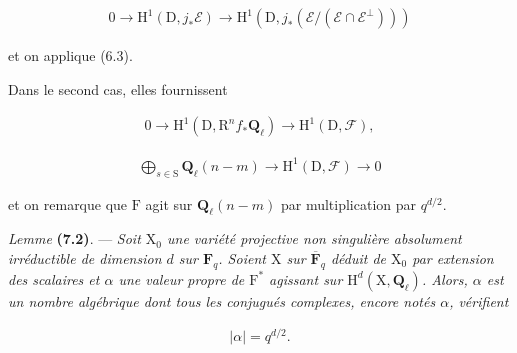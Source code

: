 \documentclass[10pt,leqno]{article}
\begin{document}
\begin{equation*}\begin{gathered}0 \longrightarrow  \mathrm{H}^{1}(\mathrm{D},j_{*}\mathcal{E} ) \longrightarrow  \mathrm{H}^{1}(\mathrm{D},j_{*}(\mathcal{E} /(\mathcal{E} \cap \mathcal{E} ^{\perp })))\end{gathered}\tag{7.1.3′}\end{equation*}

\noindent et on applique (6.3).\par

\noindent Dans le second cas, elles fournissent\par

\begin{equation*}\begin{gathered}0 \longrightarrow  \mathrm{H}^{1}(\mathrm{D},\mathrm{R}^{n} f_{*}\mathbf{Q}_{\ell }) \longrightarrow  \mathrm{H}^{1}(\mathrm{D},\mathcal{F} ),\end{gathered}\tag{7.1.4′}\end{equation*}

\begin{equation*}\begin{gathered}\bigoplus\limits_{s\in \mathrm{S}}\mathbf{Q}_{\ell }(n- m) \longrightarrow  \mathrm{H}^{1}(\mathrm{D},\mathcal{F} ) \longrightarrow  0\end{gathered}\tag{7.1.5′}\end{equation*}

\noindent et on remarque que \(\mathrm{F}\) agit sur \(\mathbf{Q}_{\ell }(n- m)\) par multiplication par \(q^{d/2}\).\par

\noindent \emph{Lemme} \textbf{(7.2)}. — {\itshape Soit \(\mathrm{X}_{0}\) une variété projective non singulière absolument irréductible de dimension \(d\) sur \(\mathbf{F}_{q}\). Soient \(\mathrm{X}\) sur \(\overline{\mathbf{F}}_{q}\) déduit de \(\mathrm{X}_{0}\) par extension des scalaires et \(\alpha \) une valeur propre de \(\mathrm{F}^{*}\) agissant sur \(\mathrm{H}^{d}(\mathrm{X},\mathbf{Q}_{\ell })\). Alors, \(\alpha \) est un nombre algébrique dont tous les conjugués complexes, encore notés \(\alpha \), vérifient}\par

\begin{equation*}\begin{gathered}|\alpha |=q^{d/2}.\end{gathered}\end{equation*}
\end{document}

